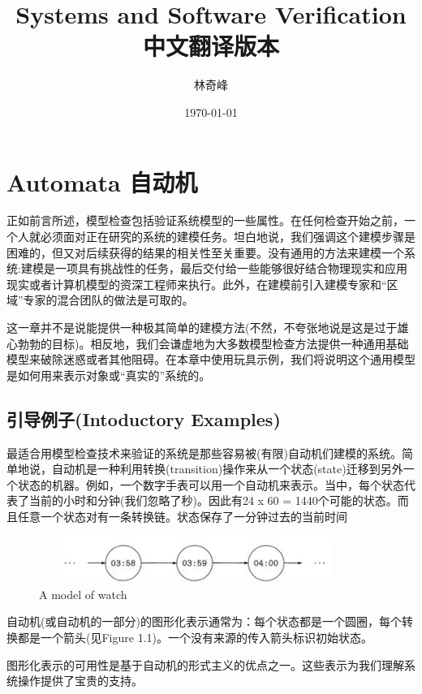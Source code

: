 \documentclass{book}
\begin{document}
\title{Systems and Software Verification中文翻译版本}
\author{林奇峰}
\date{\today}
\maketitle
\tableofcontents
    \chapter{Automata 自动机}

    正如前言所述，模型检查包括验证系统模型的一些属性。在任何检查开始之前，一个人就必须面对正在研究的系统的建模任务。坦白地说，我们强调这个建模步骤是困难的，但又对后续获得的结果的相关性至关重要。没有通用的方法来建模一个系统:建模是一项具有挑战性的任务，最后交付给一些能够很好结合物理现实和应用现实或者计算机模型的资深工程师来执行。此外，在建模前引入建模专家和“区域”专家的混合团队的做法是可取的。

    这一章并不是说能提供一种极其简单的建模方法(不然，不夸张地说是这是过于雄心勃勃的目标)。相反地，我们会谦虚地为大多数模型检查方法提供一种通用基础模型来破除迷惑或者其他阻碍。在本章中使用玩具示例，我们将说明这个通用模型是如何用来表示对象或“真实的”系统的。

    \section{引导例子(Intoductory Examples)}

    最适合用模型检查技术来验证的系统是那些容易被(有限)自动机们建模的系统。简单地说，自动机是一种利用转换(transition)操作来从一个状态(state)迁移到另外一个状态的机器。例如，一个数字手表可以用一个自动机来表示。当中，每个状态代表了当前的小时和分钟(我们忽略了秒)。因此有24 x 60 = 1440个可能的状态。而且任意一个状态对有一条转换链。状态保存了一分钟过去的当前时间
    \begin{figure}
    \centering
    \includegraphics[height=0.6in,width=4.0in]{1_1.jpg}
    \caption{A model of watch}
    \end{figure}

    自动机(或自动机的一部分)的图形化表示通常为：每个状态都是一个圆圈，每个转换都是一个箭头(见Figure 1.1)。一个没有来源的传入箭头标识初始状态。

    图形化表示的可用性是基于自动机的形式主义的优点之一。这些表示为我们理解系统操作提供了宝贵的支持。
\end{document}
